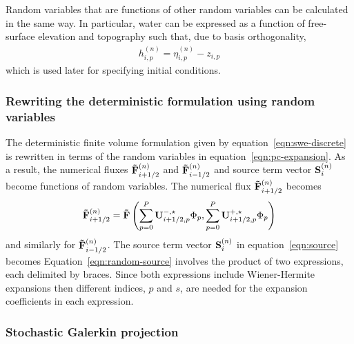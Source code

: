 Random variables that are functions of other random variables can be calculated in the same way.
In particular, water  can be expressed as a function of free-surface elevation and topography such that, due to basis orthogonality,
\begin{align}
h_{i,p}^{(n)} = \eta_{i,p}^{(n)} - z_{i,p}
\label{eqn:h-eta-z}
\end{align}
which is used later for specifying initial conditions.

\subsubsection*{Rewriting the deterministic formulation using random variables}

The deterministic finite volume formulation given by equation~\eqref{eqn:swe-discrete} is rewritten in terms of the random variables in equation~\eqref{eqn:pc-expansion}.
As a result, the numerical fluxes $\mathbf{\tilde{F}}_{i+1/2}^{(n)}$ and $\mathbf{\tilde{F}}_{i-1/2}^{(n)}$ and source term vector $\mathbf{S}_i^{(n)}$ become functions of random variables.
The numerical flux $\mathbf{\tilde{F}}_{i+1/2}^{(n)}$ becomes
\begin{align}
	\mathbf{\tilde{F}}_{i+1/2}^{(n)} = \mathbf{\tilde{F}} \left(
	\sum_{p=0}^P \mathbf{U}^{-,\star}_{i+1/2,p} \Phi_p, 
	\sum_{p=0}^P \mathbf{U}^{+,\star}_{i+1/2,p} \Phi_p
	\right)
\end{align}
and similarly for $\mathbf{\tilde{F}}_{i-1/2}^{(n)}$.
The source term vector $\mathbf{S}_i^{(n)}$ in equation~\eqref{eqn:source} becomes
Equation~\eqref{eqn:random-source} involves the product of two expressions, each delimited by braces.
Since both expressions include Wiener-Hermite expansions then different indices, $p$ and $s$, are needed for the expansion coefficients in each expression.

\subsubsection*{Stochastic Galerkin projection}


